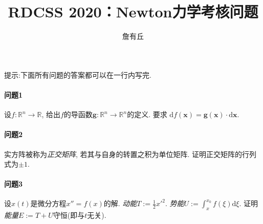 \documentclass{article}
\title{RDCSS 2020：Newton力学考核问题}
\author{詹有丘}
\begin{document}
\maketitle

提示:下面所有问题的答案都可以在一行内写完.

\paragraph{问题1}
设$f:\mathbb R^n\rightarrow\mathbb R$,
给出$f$的导函数$\mathbf g:\mathbb R^n\rightarrow\mathbb R^n$的定义.
要求
$\mathrm df\left(\mathbf x\right)=
\mathbf g\left(\mathbf x\right)\cdot\mathrm d\mathbf x$.

\paragraph{问题2}
实方阵被称为\textit{正交矩阵},
若其与自身的转置之积为单位矩阵.
证明正交矩阵的行列式为$\pm1$.

\paragraph{问题3}
设$x\left(t\right)$是微分方程$x''=f\left(x\right)$的解.
\textit{动能}$T:=\frac12x'^2$.
\textit{势能}$U:=\int_x^{x_0}f\left(\xi\right)\mathrm d\xi$.
证明\textit{能量}$E:=T+U$守恒(即与$t$无关).
\end{document}
